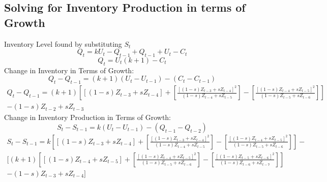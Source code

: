 \documentclass[]{article}
\begin{document}
\subsection{Solving for Inventory Production in terms of Growth}
\noindent Inventory Level found by substituting $S_t$
	\begin{equation*}
		Q_t=kU_t-Q_{t-1}+Q_{t-1}+U_t-C_t
	\end{equation*}
	\begin{equation}
		Q_t=U_t(k+1)-C_t
	\end{equation}
Change in Inventory in Terms of Growth:
	\begin{equation*}
		Q_t-Q_{t-1}=(k+1)(U_t-U_{t-1})-(C_t-C_{t-1})
	\end{equation*}
	\begin{equation}
	\begin{split}
		Q_t-Q_{t-1}=(k+1)\left[[(1-s)Z_{t-3}+sZ_{t-4}]+\left[\frac{[(1-s)Z_{t-3}+sZ_{t-4}]^2}{(1-s)Z_{t-4}+sZ_{t-5}}\right]-\left[\frac{[(1-s)Z_{t-4}+sZ_{t-5}]^2}{(1-s)Z_{t-5}+sZ_{t-6}}\right]\right]\\
		-(1-s)Z_{t-2}+sZ_{t-3}
	\end{split}
	\end{equation}
Change in Inventory Production in Terms of Growth:
	\begin{equation*}
		S_t-S_{t-1}=k(U_t-U_{t-1})-(Q_{t-1}-Q_{t-2})
	\end{equation*}
	\begin{equation}
	\begin{split}
		S_t-S_{t-1}=k\left[[(1-s)Z_{t-3}+sZ_{t-4}]+\left[\frac{[(1-s)Z_{t-3}+sZ_{t-4}]^2}{(1-s)Z_{t-4}+sZ_{t-5}}\right]-\left[\frac{[(1-s)Z_{t-4}+sZ_{t-5}]^2}{(1-s)Z_{t-5}+sZ_{t-6}}\right]\right]-\\
		[(k+1)\left[[(1-s)Z_{t-4}+sZ_{t-5}]+\left[\frac{[(1-s)Z_{t-4}+sZ_{t-5}]^2}{(1-s)Z_{t-5}+sZ_{t-6}}\right]-\left[\frac{[(1-s)Z_{t-5}+sZ_{t-6}]^2}{(1-s)Z_{t-6}+sZ_{t-7}}\right]\right]\\
		-(1-s)Z_{t-3}+sZ_{t-4}]
	\end{split}
	\end{equation}
\end{document}
